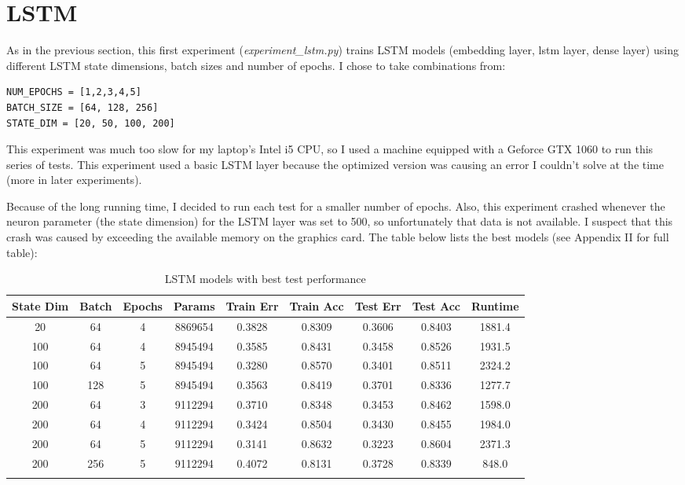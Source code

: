 \documentclass[letterpaper, 10pt]{article}
\begin{document}
\section{LSTM}

As in the previous section, this first experiment ({\em experiment\_lstm.py}) trains
LSTM models (embedding layer, lstm layer, dense layer) using different
LSTM state dimensions, batch sizes and number of epochs. I chose to take
combinations from:

\begin{verbatim}
NUM_EPOCHS = [1,2,3,4,5]
BATCH_SIZE = [64, 128, 256]
STATE_DIM = [20, 50, 100, 200]
\end{verbatim}

This experiment was much too slow for my laptop's Intel i5 CPU, so I used a machine
equipped with a Geforce GTX 1060 to run this series of tests. This experiment used
a basic LSTM layer because the optimized version was causing an error I couldn't
solve at the time (more in later experiments).

Because of the long running time, I decided to run each test
for a smaller number of epochs. Also, this experiment crashed whenever
the neuron parameter (the state dimension) for the LSTM layer was set to 500, so
unfortunately that data is not available. I suspect that this crash was
caused by exceeding the available memory on the graphics card.
The table below lists the best models (see Appendix II for full table):

\newpage

\begin{longtable}{c | c | c | c | c | c | c | c | c}
State Dim & Batch & Epochs & Params & Train Err & Train Acc & Test Err & Test Acc & Runtime\\
\hline
\endhead
20 & 64 & 4 & 8869654 & 0.3828 & 0.8309 & 0.3606 & 0.8403 & 1881.4 \\
100 & 64 & 4 & 8945494 & 0.3585 & 0.8431 & 0.3458 & 0.8526 & 1931.5 \\
100 & 64 & 5 & 8945494 & 0.3280 & 0.8570 & 0.3401 & 0.8511 & 2324.2 \\
100 & 128 & 5 & 8945494 & 0.3563 & 0.8419 & 0.3701 & 0.8336 & 1277.7 \\
200 & 64 & 3 & 9112294 & 0.3710 & 0.8348 & 0.3453 & 0.8462 & 1598.0 \\
200 & 64 & 4 & 9112294 & 0.3424 & 0.8504 & 0.3430 & 0.8455 & 1984.0 \\
200 & 64 & 5 & 9112294 & 0.3141 & 0.8632 & 0.3223 & 0.8604 & 2371.3 \\
200 & 256 & 5 & 9112294 & 0.4072 & 0.8131 & 0.3728 & 0.8339 & 848.0 \\
\caption{LSTM models with best test performance}
\label{tab:resultslstm}
\end{longtable}
\end{document}
